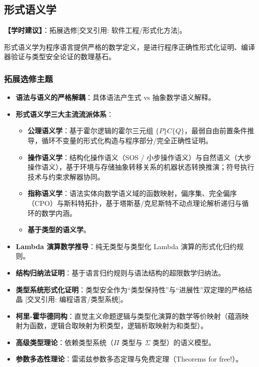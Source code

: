\subsection{形式语义学}
\textbf{【学时建议】}：拓展选修[交叉引用: 软件工程/形式化方法]。

形式语义学为程序语言提供严格的数学定义，是进行程序正确性形式化证明、编译器验证与类型安全论证的数理基石。

\subsubsection{拓展选修主题}
\begin{itemize}
    \item \textbf{语法与语义的严格解耦}：具体语法产生式 vs 抽象数学语义解释。
    \item \textbf{形式语义学三大主流流派体系}：
    \begin{itemize}
        \item \textbf{公理语义学}：基于霍尔逻辑的霍尔三元组 $\{P\} C \{Q\}$，最弱自由前置条件推导，循环不变量的形式化构造与程序部分/完全正确性证明。
        \item \textbf{操作语义学}：结构化操作语义（SOS / 小步操作语义）与自然语义（大步操作语义），基于环境与存储抽象转移关系的机器状态转换推演；符号执行技术与约束求解器协同。
        \item \textbf{指称语义学}：语法实体向数学语义域的函数映射，偏序集、完全偏序（CPO）与斯科特拓扑，基于塔斯基/克尼斯特不动点理论解析递归与循环的数学内涵。
        \item \textbf{基于类型的语义学}。
    \end{itemize}
    \item \textbf{Lambda 演算数学推导}：纯无类型与类型化 Lambda 演算的形式化归约规则。
    \item \textbf{结构归纳法证明}：基于语言归约规则与语法结构的超限数学归纳法。
    \item \textbf{类型系统形式化证明}：类型安全作为“类型保持性”与“进展性”双定理的严格结晶 [交叉引用: 编程语言/类型系统]。
    \item \textbf{柯里-霍华德同构}：直觉主义命题逻辑与类型化演算的数学等价映射（蕴涵映射为函数，逻辑合取映射为积类型，逻辑析取映射为和类型）。
    \item \textbf{高级类型理论}：依赖类型系统（$\Pi$ 类型与 $\Sigma$ 类型）的语义模型。
    \item \textbf{参数多态性理论}：雷诺兹参数多态定理与免费定理（Theorems for free!）。
\end{itemize}

